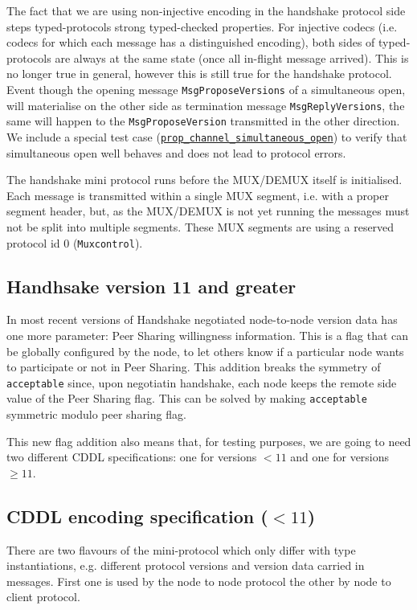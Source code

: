 The fact that we are using non-injective encoding in the handshake protocol
side steps typed-protocols strong typed-checked properties.  For injective
codecs (i.e. codecs for which each message has a distinguished encoding), both
sides of typed-protocols are always at the same state (once all in-flight
message arrived).  This is no longer true in general, however this is still
true for the handshake protocol.  Event though the opening message
\texttt{MsgProposeVersions} of a simultaneous open, will materialise on the
other side as termination message \texttt{MsgReplyVersions}, the same will
happen to the \texttt{MsgProposeVersion} transmitted in the other direction.
We include a special test case
(\href{https://github.com/input-output-hk/ouroboros-network/blob/master/ouroboros-network/protocol-tests/Ouroboros/Network/Protocol/Handshake/Test.hs\#L551}{\texttt{prop\_channel\_simultaneous\_open}})
to verify that simultaneous open well behaves and does not lead to protocol
errors.

The handshake mini protocol runs before the MUX/DEMUX itself is initialised.
Each message is transmitted within a single MUX segment, i.e. with a proper
segment header, but, as the MUX/DEMUX is not yet running the messages must not
be split into multiple segments.  These MUX segments are using a reserved
protocol id $0$ (\texttt{Muxcontrol}).

\subsection{Handhsake version 11 and greater}

In most recent versions of Handshake negotiated node-to-node version data has
one more parameter: Peer Sharing willingness information. This is a flag that
can be globally configured by the node, to let others know if a particular node
wants to participate or not in Peer Sharing. This addition breaks the symmetry
of \texttt{acceptable} since, upon negotiatin handshake, each node keeps the
remote side value of the Peer Sharing flag. This can be solved by making
\texttt{acceptable} symmetric modulo peer sharing flag.

This new flag addition also means that, for testing purposes, we are going to
need two different CDDL specifications: one for versions $< 11$ and one for
versions $\geq 11$.

\subsection{CDDL encoding specification ($< 11$)}\label{handshake-cddl}
There are two flavours of the mini-protocol which only differ with type
instantiations, e.g. different protocol versions and version data carried in
messages.  First one is used by the node to node protocol the other by node to
client protocol.

